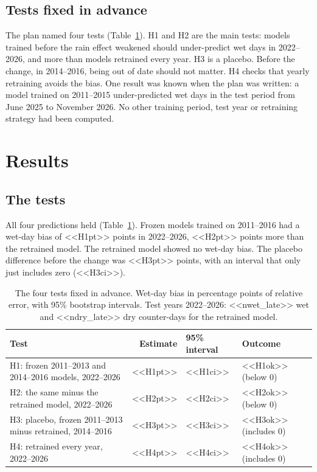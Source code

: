 \documentclass[preprint,12pt,authoryear]{elsarticle}
\begin{document}
\subsection{Tests fixed in advance}

The plan named four tests (Table~\ref{tab:tests}). H1 and H2 are the main tests: models trained before the rain effect weakened should under-predict wet days in 2022--2026, and more than models retrained every year. H3 is a placebo. Before the change, in 2014--2016, being out of date should not matter. H4 checks that yearly retraining avoids the bias. One result was known when the plan was written: a model trained on 2011--2015 under-predicted wet days in the test period from June 2025 to November 2026. No other training period, test year or retraining strategy had been computed.

\section{Results}

\subsection{The tests}

All four predictions held (Table~\ref{tab:tests}). Frozen models trained on 2011--2016 had a wet-day bias of <<H1pt>> points in 2022--2026, <<H2pt>> points more than the retrained model. The retrained model showed no wet-day bias. The placebo difference before the change was <<H3pt>> points, with an interval that only just includes zero (<<H3ci>>).

\begin{table}[!htbp]
\centering
\caption{The four tests fixed in advance. Wet-day bias in percentage points of relative error, with 95\% bootstrap intervals. Test years 2022--2026: <<nwet_late>> wet and <<ndry_late>> dry counter-days for the retrained model.}
\label{tab:tests}
\small
\begin{tabular}{@{}p{5.7cm}rp{2.8cm}p{2.2cm}@{}}
\toprule
Test & Estimate & 95\% interval & Outcome \\
\midrule
H1: frozen 2011--2013 and 2014--2016 models, 2022--2026 & <<H1pt>> & <<H1ci>> & <<H1ok>> (below 0) \\
H2: the same minus the retrained model, 2022--2026 & <<H2pt>> & <<H2ci>> & <<H2ok>> (below 0) \\
H3: placebo, frozen 2011--2013 minus retrained, 2014--2016 & <<H3pt>> & <<H3ci>> & <<H3ok>> (includes 0) \\
H4: retrained every year, 2022--2026 & <<H4pt>> & <<H4ci>> & <<H4ok>> (includes 0) \\
\bottomrule
\end{tabular}
\end{table}
\end{document}

